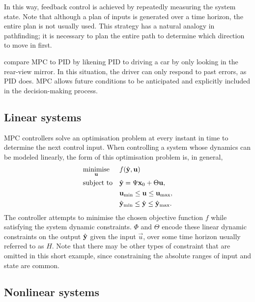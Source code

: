 In this way, feedback control is achieved by repeatedly measuring the system state.
Note that although a plan of inputs is generated over a time horizon, the entire plan is not usually used.
This strategy has a natural analogy in pathfinding; it is necessary to plan the entire path to determine which direction to move in first.

 compare MPC to PID by likening PID to driving a car by only looking in the rear-view mirror.
In this situation, the driver can only respond to past errors, as PID does.
MPC allows future conditions to be anticipated and explicitly included in the decision-making process.

\subsection{Linear systems}

MPC controllers solve an optimisation problem at every instant in time to determine the next control input.
When controlling a system whose dynamics can be modeled linearly, the form of this optimisation problem is, in general,
\begin{equation}
   \label{eq:mpc-opt}
   \begin{aligned}
      & \underset{\mathbf{u}}{\text{minimise}}
      & & f(\hat{\mathbf{y}}, \mathbf{u}) \\
      & \text{subject to}
      & & \hat{\mathbf{y}} = \Psi \mathbf{x}_0 + \Theta \mathbf{u}, \\
      &&& \mathbf{u}_{\text{min}} \le \mathbf{u} \le \mathbf{u}_{\text{max}}, \\
      &&& \hat{\mathbf{y}}_{\text{min}} \le \hat{\mathbf{y}} \le \hat{\mathbf{y}}_{\text{max}}.
   \end{aligned}
\end{equation}
The controller attempts to minimise the chosen objective function $f$ while satisfying the system dynamic constraints.
$\Phi$ and $\Theta$ encode these linear dynamic constraints on the output $\hat{\mathbf{y}}$ given the input $\vec{u}$, over some time horizon usually referred to as $H$.
Note that there may be other types of constraint that are omitted in this short example, since constraining the absolute ranges of input and state are common.

\subsection{Nonlinear systems}


